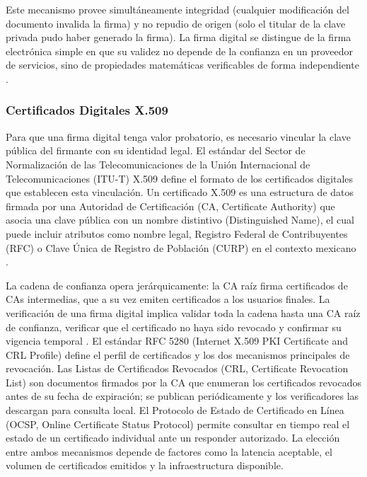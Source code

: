 Este mecanismo provee simultáneamente integridad (cualquier modificación del documento invalida la firma) y no repudio de origen (solo el titular de la clave privada pudo haber generado la firma). La firma digital se distingue de la firma electrónica simple en que su validez no depende de la confianza en un proveedor de servicios, sino de propiedades matemáticas verificables de forma independiente \cite{stallings2017,nist2023fips186}.

\subsubsection{Certificados Digitales X.509}

Para que una firma digital tenga valor probatorio, es necesario vincular la clave pública del firmante con su identidad legal. El estándar del Sector de Normalización de las Telecomunicaciones de la Unión Internacional de Telecomunicaciones (ITU-T) X.509 define el formato de los certificados digitales que establecen esta vinculación. Un certificado X.509 es una estructura de datos firmada por una Autoridad de Certificación (CA, Certificate Authority) que asocia una clave pública con un nombre distintivo (Distinguished Name), el cual puede incluir atributos como nombre legal, Registro Federal de Contribuyentes (RFC) o Clave Única de Registro de Población (CURP) en el contexto mexicano \cite{itu2019}.

La cadena de confianza opera jerárquicamente: la CA raíz firma certificados de CAs intermedias, que a su vez emiten certificados a los usuarios finales. La verificación de una firma digital implica validar toda la cadena hasta una CA raíz de confianza, verificar que el certificado no haya sido revocado y confirmar su vigencia temporal \cite{itu2019}. El estándar RFC 5280 \cite{cooper2008} (Internet X.509 PKI Certificate and CRL Profile) define el perfil de certificados y los dos mecanismos principales de revocación. Las Listas de Certificados Revocados (CRL, Certificate Revocation List) son documentos firmados por la CA que enumeran los certificados revocados antes de su fecha de expiración; se publican periódicamente y los verificadores las descargan para consulta local. El Protocolo de Estado de Certificado en Línea (OCSP, Online Certificate Status Protocol) permite consultar en tiempo real el estado de un certificado individual ante un responder autorizado. La elección entre ambos mecanismos depende de factores como la latencia aceptable, el volumen de certificados emitidos y la infraestructura disponible.

